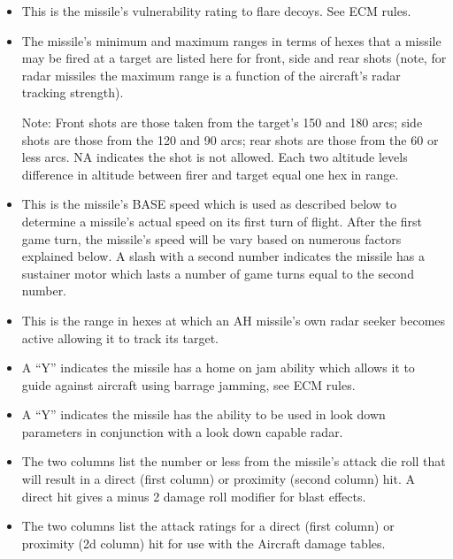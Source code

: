 \begin{itemize}
    \item {} This is the missile's vulnerability rating to flare decoys. See ECM rules.

    \item {} The missile's minimum and maximum ranges in terms of hexes that a missile may be fired at a target are listed here for front, side and rear shots (note, for radar missiles the maximum range is a function of the aircraft's radar tracking strength).

    Note: Front shots are those taken from the target's 150 and 180 arcs; side shots are those from the 120 and 90 arcs; rear shots are those from the 60 or less arcs. NA indicates the shot is not allowed. Each two altitude levels difference in altitude between firer and target equal one hex in range.

    \item {} This is the missile's BASE speed which is used as described below to determine a missile's actual speed on its first turn of flight. After the first game turn, the missile's speed will be vary based on numerous factors explained below. A slash with a second number indicates the missile has a sustainer motor which lasts a number of game turns equal to the second number.

    \item {} This is the range in hexes at which an AH missile's own radar seeker becomes active allowing it to track its target.

    \item {} A “Y” indicates the missile has a home on jam ability which allows it to guide against aircraft using barrage jamming, see ECM rules.

    \item {} A “Y” indicates the missile has the ability to be used in look down parameters in conjunction with a look down capable radar.

    \item {} The two columns list the number or less from the missile's attack die roll that will result in a direct (first column) or proximity (second column) hit. A direct hit gives a minus 2 damage roll modifier for blast effects.

    \item {} The two columns list the attack ratings for a direct (first column) or  proximity (2d column) hit for use with the Aircraft damage tables.

\end{itemize}


